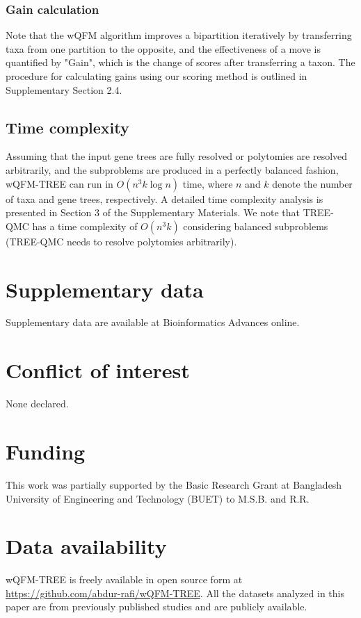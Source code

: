 \documentclass[11pt]{article}
\begin{document}
\subsubsection*{Gain calculation}

Note that the wQFM algorithm improves a bipartition iteratively by transferring taxa from one partition to the opposite, and the effectiveness of a move is quantified by "Gain", which is the change of scores after transferring a taxon. The procedure for calculating gains using our scoring method is outlined in Supplementary Section 2.4.

\subsection*{Time complexity}

Assuming that the input gene trees are fully resolved or polytomies are resolved arbitrarily, and the subproblems are produced in a perfectly balanced fashion, wQFM-TREE can run in $O(n^3 k \log n)$ time, where $n$ and $k$ denote the number of taxa and gene trees, respectively. A detailed time complexity analysis is presented in Section 3 of the Supplementary Materials. We note that TREE-QMC has a time complexity of $O(n^3 k)$ considering balanced subproblems (TREE-QMC needs to resolve polytomies arbitrarily).

\section*{Supplementary data}
Supplementary data are available at Bioinformatics Advances online.

\section*{Conflict of interest}
None declared.

\section*{Funding}
This work was partially supported by the Basic Research Grant at Bangladesh University of Engineering and Technology (BUET) to M.S.B. and R.R.

\section*{Data availability}
wQFM-TREE is freely available in open source form at \url{https://github.com/abdur-rafi/wQFM-TREE}. All the datasets analyzed in this paper are from previously published studies and are publicly available.
\end{document}
